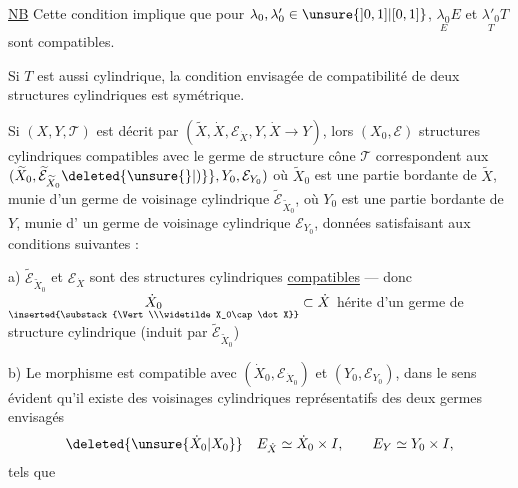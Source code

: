 \uline{NB} Cette condition implique que pour $\lambda_0,\lambda'_0\in\unsure{]0,1]|[0,1]}$,
$\underset{E}{\lambda_0}E$ et $\underset{T}{\lambda'_0}T$ sont compatibles.

Si $T$ est aussi cylindrique, la condition
envisagée de compatibilité de deux structures
cylindriques est symétrique.

Si $(X,Y,\mathcal T)$ est décrit par $(\widetilde X,\dot X,\mathcal E_{\dot X},Y,\dot X\to Y)$,
lors  $(X_0,\mathcal E)$  structures cylindriques compatibles
avec le germe de structure cône $\mathcal T$ correspondent
aux 
$(\widetilde X_0,\widetilde{\mathcal E}_{\widetilde X_0}\deleted{\unsure{\}|)}},Y_0,\mathcal E_{Y_0})$
où $\widetilde X_0$ est une partie bordante de  $\widetilde X$, munie
d'un germe de voisinage cylindrique $\widetilde{\mathcal E}_{\widetilde X_0}$,
où $Y_0$ est une partie bordante de $Y$, munie d'
un germe de  voisinage cylindrique
$\mathcal E_{Y_0}$,  données satisfaisant aux conditions
suivantes :

a) $\widetilde{\mathcal E}_{\widetilde X_0}$ et $\mathcal E_{\dot X}$ sont des
 structures cylindriques
\uline{compatibles} --- donc $\underset{\inserted{\substack{\Vert\\\widetilde X_0\cap\dot X}}}{\dot X_0}\subset\dot X$
hérite d'un
germe de structure cylindrique  (induit par
$\widetilde{\mathcal E}_{\widetilde X_0}$)

b) Le morphisme
est compatible
avec $(\dot X_0,\mathcal E_{\dot X_0})$ et $(Y_0,\mathcal E_{Y_0})$, dans le sens
évident 
qu'il existe des voisinages cylindriques
représentatifs des deux germes envisagés
\[
\deleted{\unsure{\dot X_0|X_0}}\quad
E_{\dot X}\simeq\dot X_0\times I,\qquad E_Y\simeq Y_0\times I,
\]
tels que
